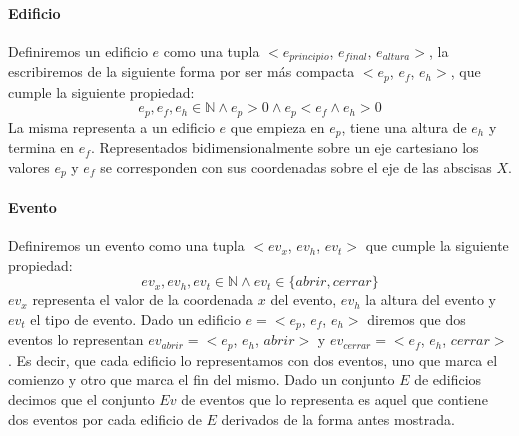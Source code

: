 \paragraph{Edificio}
Definiremos un edificio $e$ como una tupla $<e_{principio}$, $e_{final}$, $e_{altura}>$, la escribiremos de la siguiente forma por ser más compacta $<e_p$, $e_f$, $e_h>$, que cumple la siguiente propiedad:
\begin{displaymath}
	e_p, e_f, e_h \in \mathbb{N} \land e_p > 0 \land e_p < e_f \land e_h > 0
\end{displaymath}
La misma representa a un edificio $e$ que empieza en $e_p$, tiene una altura de $e_h$ y termina en $e_f$. 
Representados bidimensionalmente sobre un eje cartesiano los valores $e_p$ y $e_f$ se corresponden con
sus coordenadas sobre el eje de las abscisas $X$.

\paragraph{Evento}
Definiremos un evento como una tupla $<ev_x$, $ev_h$, $ev_t>$ que cumple la siguiente propiedad:
\begin{displaymath}
	ev_x, ev_h, ev_t \in \mathbb{N} \land ev_t \in \{ abrir, cerrar\}
\end{displaymath}
$ev_x$ representa el valor de la coordenada $x$ del evento, $ev_h$ la altura del evento y $ev_t$ el tipo de 
evento.
Dado un edificio $e = <e_p$, $e_f$, $e_h>$  diremos que dos eventos lo representan $ev_{abrir} = <e_p$, $e_h$, $abrir>$ y $ev_{cerrar} = <e_f$, $e_h$, $cerrar>$.
Es decir, que cada edificio lo representamos con dos eventos, uno que marca el comienzo y otro que marca el fin del mismo. 
Dado un conjunto $E$ de edificios decimos que el conjunto $Ev$ de eventos que lo representa es aquel que contiene dos eventos
por cada edificio de $E$ derivados de la forma antes mostrada.


